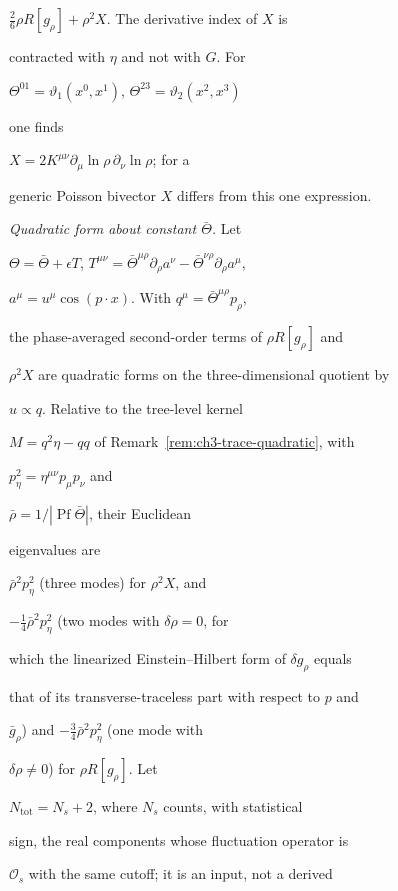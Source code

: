 \(\tfrac26\rho R[g_\rho]+\rho^2X\). The derivative index of \(X\) is

contracted with \(\eta\) and not with \(G\). For

\(\Theta^{01}=\vartheta_1(x^0,x^1)\), \(\Theta^{23}=\vartheta_2(x^2,x^3)\)

one finds

\(X=2K^{\mu\nu}\partial_\mu\ln\rho\,\partial_\nu\ln\rho\); for a

generic Poisson bivector \(X\) differs from this one expression.



\emph{Quadratic form about constant \(\bar\Theta\).} Let

\(\Theta=\bar\Theta+\epsilon T\), \(T^{\mu\nu}

=\bar\Theta^{\mu\rho}\partial_\rho a^\nu-\bar\Theta^{\nu\rho}\partial_\rho a^\mu\),

\(a^\mu=u^\mu\cos(p\cdot x)\). With \(q^\mu=\bar\Theta^{\mu\rho}p_\rho\),

the phase-averaged second-order terms of \(\rho R[g_\rho]\) and

\(\rho^2X\) are quadratic forms on the three-dimensional quotient by

\(u\propto q\). Relative to the tree-level kernel

\(M=q^2\eta-qq\) of Remark~\ref{rem:ch3-trace-quadratic}, with

\(p_\eta^2=\eta^{\mu\nu}p_\mu p_\nu\) and

\(\bar\rho=1/|\operatorname{Pf}\bar\Theta|\), their Euclidean

eigenvalues are

\(\bar\rho^{2}p_\eta^2\) (three modes) for \(\rho^2X\), and

\(-\tfrac14\bar\rho^{2}p_\eta^2\) (two modes with \(\delta\rho=0\), for

which the linearized Einstein--Hilbert form of \(\delta g_\rho\) equals

that of its transverse-traceless part with respect to \(p\) and

\(\bar g_\rho\)) and \(-\tfrac34\bar\rho^{2}p_\eta^2\) (one mode with

\(\delta\rho\ne0\)) for \(\rho R[g_\rho]\). Let

\(N_{\mathrm{tot}}=N_s+2\), where \(N_s\) counts, with statistical

sign, the real components whose fluctuation operator is

\(\mathcal O_s\) with the same cutoff; it is an input, not a derived

